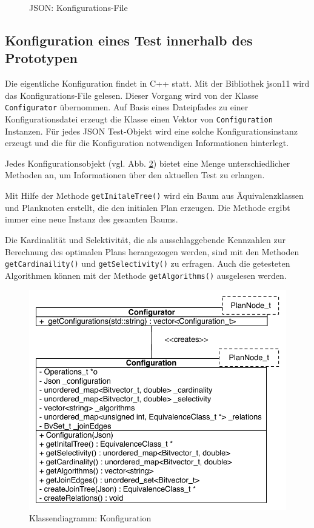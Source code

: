 \begin{figure}[ht]

\caption{JSON: Konfigurations-File}
\label{JsonConfigFile}
\end{figure}

\subsection{Konfiguration eines Test innerhalb des Prototypen}

Die eigentliche Konfiguration findet in C++ statt. Mit der Bibliothek json11 \cite{json11} wird das Konfigurations-File gelesen. Dieser Vorgang wird von der Klasse \texttt{Config\-urator} übernommen. Auf Basis eines Dateipfades zu einer Konfigurationsdatei erzeugt die Klasse einen Vektor von \texttt{Configuration} Instanzen. Für jedes JSON Test-Objekt wird eine solche Konfigurationsinstanz erzeugt und die für die Konfiguration notwendigen Informationen hinterlegt.

Jedes Konfigurationsobjekt (vgl. Abb. \ref{Konfiguration}) bietet eine Menge unterschiedlicher Methoden an, um Informationen über den aktuellen Test zu erlangen.

Mit Hilfe der Methode \texttt{getInitaleTree()} wird ein Baum aus Äquivalenzklassen und Planknoten erstellt, die den initialen Plan erzeugen. Die Methode ergibt immer eine neue Instanz des gesamten Baums.

Die Kardinalität und Selektivität, die als ausschlaggebende Kennzahlen zur Berechnung des optimalen Plans herangezogen werden, sind mit den Methoden \texttt{get\-Cardinaility()} und \texttt{get\-Selectivity()} zu erfragen. Auch die getesteten Algorithmen können mit der Methode \texttt{getAlgorithms()} ausgelesen werden.


\begin{figure}[ht]
  \centering
  \includegraphics[scale=0.75]{04_Implementierung/00_media/ConfigurationClass.pdf}
  \caption{Klassendiagramm: Konfiguration}
  \label{Konfiguration}
\end{figure}

